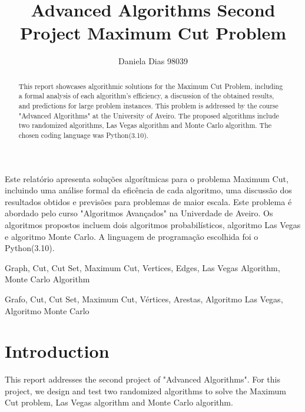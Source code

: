 \documentclass[]{revdetua}
\begin{document}

\title{Advanced Algorithms Second Project \linebreak Maximum Cut Problem}
\author{Daniela Dias 98039}
\maketitle

\begin{abstract}
This report showcases algorithmic solutions for the Maximum Cut Problem, including a formal analysis of each algorithm's efficiency, a discussion of the obtained results, and predictions for large problem instances. This problem is addressed by the course "Advanced Algorithms" at the University of Aveiro. The proposed algorithms include two randomized algorithms, Las Vegas algorithm and Monte Carlo algorithm. The chosen coding language was Python(3.10).
\end{abstract}

\begin{resumo}
Este relatório apresenta soluções algorítmicas para o problema Maximum Cut, incluindo uma análise formal da eficência de cada algoritmo, uma discussão dos resultados obtidos e previsões para problemas de maior escala. Este problema é abordado pelo curso "Algoritmos Avançados" na Univerdade de Aveiro. Os algoritmos propostos incluem dois algoritmos probabilísticos, algoritmo Las Vegas e algoritmo Monte Carlo. A linguagem de programação escolhida foi o Python(3.10).
\end{resumo}

\begin{keywords}%
Graph, Cut, Cut Set, Maximum Cut, Vertices, Edges, Las Vegas Algorithm, Monte Carlo Algorithm
\end{keywords}

\begin{palavraschave}%
Grafo, Cut, Cut Set, Maximum Cut, Vértices, Arestas, Algoritmo Las Vegas, Algoritmo Monte Carlo
\end{palavraschave}

\section{Introduction}
This report addresses the second project of "Advanced Algorithms". For this project, we design and test two randomized algorithms to solve the Maximum Cut problem, Las Vegas algorithm and Monte Carlo algorithm.
\end{document}
